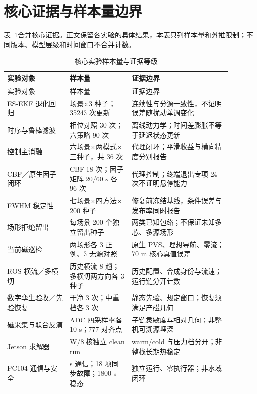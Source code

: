 \section{核心证据与样本量边界}\label{sec:app-a-7}

表~\ref{tab:app-a-data-sources}合并核心证据。正文保留各实验的具体结果，本表只列样本量和外推限制；不同版本、模型层级和时间窗口不合并计数。

\begin{longtable}{@{}>{\raggedright\arraybackslash}p{0.25\linewidth}>{\raggedright\arraybackslash}p{0.25\linewidth}>{\raggedright\arraybackslash}p{0.40\linewidth}@{}}
\caption{核心实验样本量与证据等级}\label{tab:app-a-data-sources}\\
\toprule
实验对象 & 样本量 & 证据边界\\
\midrule
\endfirsthead
\toprule
实验对象 & 样本量 & 证据边界\\
\midrule
\endhead
\bottomrule
\endfoot
ES-EKF 退化回归 & 8 场景$\times$3 种子；35243 次更新 & 连续性与分源一致性，不证明误差随扰动单调变化\\
时序与鲁棒滤波 & 相位对照 30 次；六策略 90 次 & 离线动力学；时间差膨胀不等于延迟状态更新\\
控制主消融 & 六场景$\times$两模式$\times$三种子，共 36 次 & 代理闭环；平滑收益与横向精度分别报告\\
CBF／原生因子闭环 & CBF 18 次；因子矩阵 20/60 s 各 96 次 & 代理控制；终端退出专项 24 次不证明悬停能力\\
FWHM 稳定性 & 七场景$\times$四方法$\times$200 种子 & 修复前冻结基线，条件误差与发布率同时报告\\
场形拒绝留出 & 每场景 200 个独立留出种子 & 两类已知包络；不保证未知多芯、多源场形\\
当前磁巡检 & 两场形各 3 正例、3 无源对照 & 原生 PVS、理想导航、零流；70 m 核心真值误差\\
ROS 横流／多横切 & 历史横流 8 趟；多横切两方向各 3 种子 & 历史配置、合成身份与流速；运行链分开计数\\
数字孪生验收／先验恢复 & 干净 3 次；中重档各 3 次 & 静态先验、规定窗口；恢复须满足产磁几何\\
磁采集与联合反演 & ADC 四采样率各 10 s；777 对齐点 & 子链灵敏度与相对几何；非整机可溯源埋深\\
Jetson 求解器 & 25 W/8 核独立 clean run & warm/cold 与压力档分开；非整栈长期热稳定\\
PC104 通信与安全 & 300 s 通信；18 项同步故障；1800 s 稳态 & 独立运行、零执行器；非水域闭环\\
\end{longtable}

